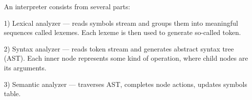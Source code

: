 \label{index_md_README}%
%
 

An interpreter consists from several parts\+:

1) Lexical analyzer — reads symbols stream and groups them into meaningful sequences called lexemes. Each lexeme is then used to generate so-\/called token.

2) Syntax analyzer — reads token stream and generates abstract syntax tree (AST). Each inner node represents some kind of operation, where child nodes are its arguments.

3) Semantic analyzer — traverses AST, completes node actions, updates symbols table. 